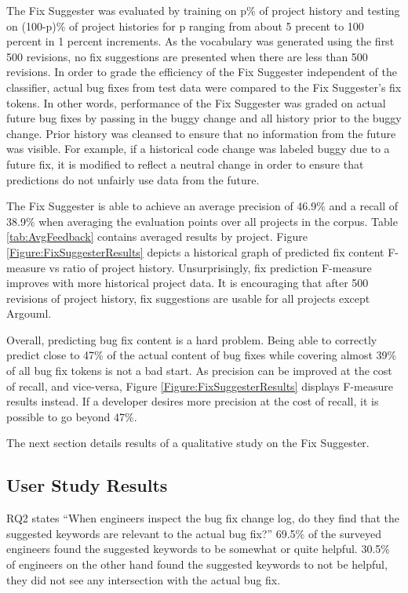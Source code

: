 \documentclass[conference]{IEEEtran}
\begin{document}
The Fix Suggester was evaluated by training on p\% of project history and testing on (100-p)\% of project histories for p ranging from about 5 precent to 100 percent in 1 percent increments. As the vocabulary was generated using the first 500 revisions, no fix suggestions are presented when there are less than 500 revisions.  In order to grade the efficiency of the Fix Suggester independent of the classifier,
actual bug fixes from test data were compared to the Fix Suggester's fix tokens. In other words, performance of the Fix Suggester was graded on actual future bug fixes by passing in the buggy change and all history prior to the buggy change. Prior history was cleansed to ensure that no information from the future was visible. For example, if a historical code change was labeled buggy due to a future fix, it is modified to reflect a neutral change in order to ensure that predictions do not unfairly use data from the future.

The Fix Suggester is able to achieve an average precision of 46.9\% and
a recall of 38.9\% when averaging the evaluation points over all projects in the corpus. Table \ref{tab:AvgFeedback} contains averaged results by project. Figure \ref{Figure:FixSuggesterResults}
 depicts a historical graph of predicted fix content F-measure vs ratio of project history. Unsurprisingly, fix prediction F-measure improves with more historical project data. It is encouraging that after 500 revisions of project history, fix suggestions are usable for all projects except Argouml.  

Overall, predicting bug fix content is a hard problem. Being able to correctly predict close to 47\% of the actual content of bug fixes while covering almost 39\% of all bug fix tokens is not a bad start. As precision can be improved at the cost of recall, and vice-versa, Figure \ref{Figure:FixSuggesterResults} displays F-measure results instead. If a developer desires more precision at the cost of recall, it is possible to go beyond 47\%. 

The next section details results of a qualitative study on the Fix Suggester.

\subsection{User Study Results}
\label{FixSuggesterUserStudy}

RQ2 states ``When engineers inspect the bug fix change log, do they find that the suggested keywords are relevant to the actual bug fix?'' 69.5\% of the surveyed engineers found the suggested keywords to be somewhat or quite helpful. 30.5\% of engineers on the other hand found the suggested keywords to not be helpful, they did not see any intersection with the actual bug fix.
\end{document}
